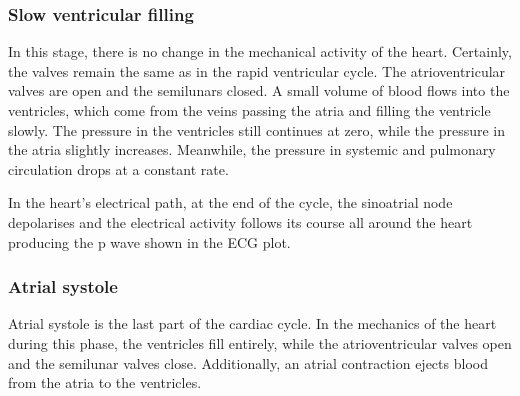 \subsubsection{Slow ventricular filling}
In this stage, there is no change in the mechanical activity of the heart. Certainly, the valves remain the same as in the rapid ventricular cycle. The atrioventricular valves are open and the semilunars closed. A small volume of blood flows into the ventricles, which come from the veins passing the atria and filling the ventricle slowly. The pressure in the ventricles still continues at zero, while the pressure in the atria slightly increases. Meanwhile, the pressure in systemic and pulmonary circulation drops at a constant rate. 

In the heart's electrical path, at the end of the cycle, the sinoatrial node depolarises and the electrical activity follows its course all around the heart producing the p wave shown in the ECG plot.  

 
\subsubsection{Atrial systole}
Atrial systole is the last part of the cardiac cycle. In the mechanics of the heart during this phase, the ventricles fill entirely, while the atrioventricular valves open and the semilunar valves close. Additionally, an atrial contraction ejects blood from the atria to the ventricles. 

